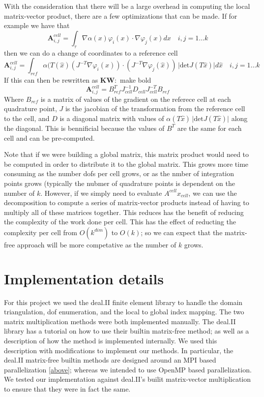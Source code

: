 \documentclass[12pt]{article}
\newcommand{\KW}[1]{{\color{blue}\textbf{KW}:~#1}}
\newcommand{\dofspercell}{k}
\begin{document}
With the consideration that there will be a large overhead in computing the local matrix-vector product, there are a few optimizations that can be made. If for example we have that 
$$\mathbf{A}^{cell}_{i,j} = \int_{\tau}\nabla \alpha(x) \varphi_{i}(x) \cdot \nabla \varphi_{j}(x) dx\quad i,j = 1 \ldots \dofspercell$$ 
then we can do a change of coordinates to a reference cell
$$\mathbf{A}^{cell}_{i,j} = \int_{ref} \alpha(T(\hat{x}) (J^{-T}\nabla \varphi_{i}(\hat{x})) \cdot (J^{-T}\nabla \varphi_{j}(\hat{x}))\,\vert \mathrm{det}J(T\hat{x}) \vert d\hat{x} \quad i,j = 1 \ldots \dofspercell$$ 
If this can then be rewritten as 
\KW{make bold}
$$\mathbf{A}^{cell}_{i,j} = B^{T}_{ref}J^{-1}_{cell}D_{cell}J^{-T}_{cell}B_{ref}$$
Where $B_{ref}$ is a matrix of values of the gradient on the referece cell at each quadrature point, $J$ is the jacobian of the transformation from the reference cell to the cell, and $D$ is a diagonal matrix with values of $\alpha(T\hat{x})\, \vert \mathrm{det}J(T\hat{x}) \vert$ along the diagonal. This is bennificial because the  values of $B^{T}$ are the same for each cell and can be pre-computed.

Note that if we were building a global matrix, this matrix product would need to be computed in order to distribute it to the global matrix. This grows more time consuming as the number dofs per cell grows, or as the nmber of integration points grows (typically the nubmer of quadrature points is dependent on the number of $\dofspercell$. However, if we simply need to evaluate $A^{cell}x_{cell}$, we can use the decomposition to compute a series of matrix-vector products instead of having to multiply all of these matrices together. This reduces has the benefit of reducing the complexity of the work done per cell. This has the effect of reducting the complexity per cell from $O(\dofspercell^{dim})$ to $O(\dofspercell)$; so we can expect that the matrix-free approach will be more competative as the number of $\dofspercell$ grows.


\section{Implementation details}
For this project we used the deal.II finite element library to handle the domain triangulation, dof enumeration, and the local to global index mapping. The two matrix multiplication methods were both implemented manually. The deal.II library has a tutorial on how to use their builtin matrix-free method; as well as a description of how the method is implemented internally. We used this description with modifications to implement our methods. In particular, the deal.II matrix-free builtin methods are designed around an MPI based parallelization \ref{above}; whereas we intended to use OpenMP based parallelization. We tested our implementation against deal.II's builit matrix-vector multiplication to ensure that they were in fact the same.
\end{document}
